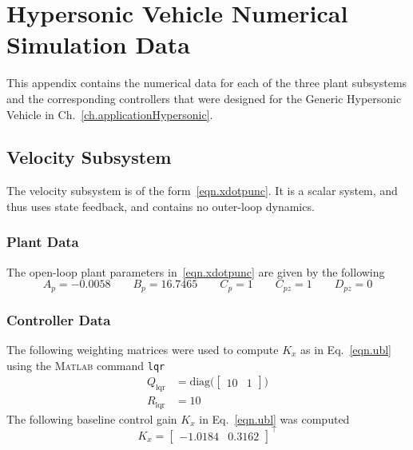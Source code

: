 \chapter{Hypersonic Vehicle Numerical Simulation Data}\label{app.numericalSimulationData}

This appendix contains the numerical data for each of the three plant subsystems and the corresponding controllers that were designed for the Generic Hypersonic Vehicle in Ch.~\ref{ch.applicationHypersonic}.

\section{Velocity Subsystem}

The velocity subsystem is of the form\ \eqref{eqn.xdotpunc}.
It is a scalar system, and thus uses state feedback, and contains no outer-loop dynamics.

\subsection{Plant Data}

The open-loop plant parameters in\ \eqref{eqn.xdotpunc} are given by the following
\begin{equation*}
  A_{p} = -0.0058
  \qquad
  B_{p} = 16.7465
  \qquad
  C_{p} = 1
  \qquad
  C_{pz} = 1
  \qquad
  D_{pz} = 0
\end{equation*}

\subsection{Controller Data}

The following weighting matrices were used to compute $K_{x}$ as in Eq.\ \eqref{eqn.ubl} using the \textsc{Matlab} command \texttt{lqr}
\begin{equation*}
  \begin{aligned}
    Q_{\text{lqr}} &=
    \text{diag}\bigr(
    \begin{bmatrix}
      10 & 1
    \end{bmatrix}
    \bigr) \\
    R_{\text{lqr}} &= 10
  \end{aligned}
\end{equation*}
The following baseline control gain $K_{x}$ in Eq.\ \eqref{eqn.ubl} was computed
\begin{equation*}
  K_{x} =
  \begin{bmatrix}
    -1.0184 & 0.3162
  \end{bmatrix}^{\top}
\end{equation*}

